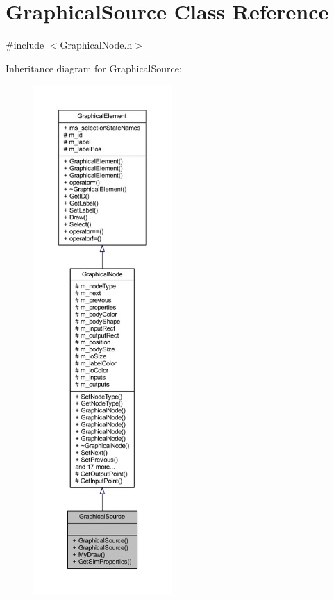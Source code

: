 \hypertarget{class_graphical_source}{}\section{Graphical\+Source Class Reference}
\label{class_graphical_source}


{\ttfamily \#include $<$Graphical\+Node.\+h$>$}



Inheritance diagram for Graphical\+Source\+:
\nopagebreak
\begin{figure}[H]
\begin{center}
\leavevmode
\includegraphics[height=550pt]{class_graphical_source__inherit__graph}
\end{center}
\end{figure}


